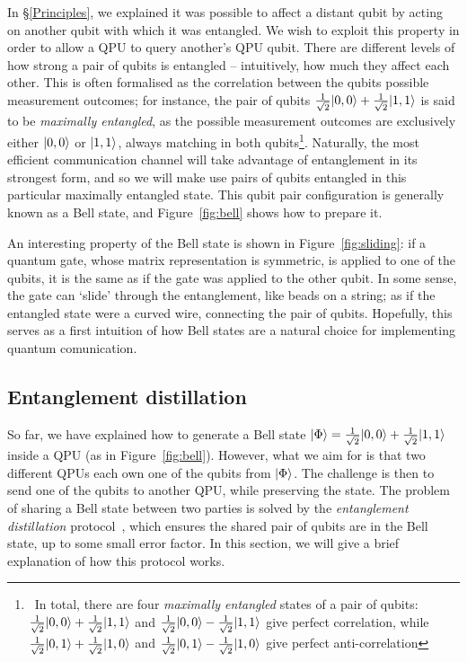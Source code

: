 In \S\ref{Principles}, we explained it was possible to affect a distant qubit by acting on another qubit with which it was entangled. We wish to exploit this property in order to allow a QPU to query another's QPU qubit. There are different levels of how strong a pair of qubits is entangled -- intuitively, how much they affect each other. This is often formalised as the correlation between the qubits possible measurement outcomes; for instance, the pair of qubits \(\frac{1}{\sqrt{2}}\vert 0,0 \rangle + \frac{1}{\sqrt{2}}\vert 1,1 \rangle\) is said to be \textit{maximally entangled}, as the possible measurement outcomes are exclusively either \(\vert 0,0 \rangle\) or \(\vert 1,1 \rangle\), always matching in both qubits\footnote{\, In total, there are four \textit{maximally entangled} states of a pair of qubits: \(\frac{1}{\sqrt{2}}\vert 0,0 \rangle + \frac{1}{\sqrt{2}}\vert 1,1 \rangle\) and \(\frac{1}{\sqrt{2}}\vert 0,0 \rangle - \frac{1}{\sqrt{2}}\vert 1,1 \rangle\) give perfect correlation, while \(\frac{1}{\sqrt{2}}\vert 0,1 \rangle + \frac{1}{\sqrt{2}}\vert 1,0 \rangle\) and \(\frac{1}{\sqrt{2}}\vert 0,1 \rangle - \frac{1}{\sqrt{2}}\vert 1,0 \rangle\) give perfect anti-correlation}. Naturally, the most efficient communication channel will take advantage of entanglement in its strongest form, and so we will make use pairs of qubits entangled in this particular maximally entangled state. This qubit pair configuration is generally known as a Bell state, and Figure~\ref{fig:bell} shows how to prepare it.



An interesting property of the Bell state is shown in Figure~\ref{fig:sliding}: if a quantum gate, whose matrix representation is symmetric, is applied to one of the qubits, it is the same as if the gate was applied to the other qubit. In some sense, the gate can `slide' through the entanglement, like beads on a string; as if the entangled state were a curved wire, connecting the pair of qubits. Hopefully, this serves as a first intuition of how Bell states are a natural choice for implementing quantum comunication.



\subsection{Entanglement distillation}
\label{Distillation}

So far, we have explained how to generate a Bell state \(\vert \Phi \rangle = \frac{1}{\sqrt{2}}\vert 0,0 \rangle + \frac{1}{\sqrt{2}}\vert 1,1 \rangle\) inside a QPU (as in Figure~\ref{fig:bell}). However, what we aim for is that two different QPUs each own one of the qubits from \(\vert \Phi \rangle\). The challenge is then to send one of the qubits to another QPU, while preserving the state. The problem of sharing a Bell state between two parties is solved by the \textit{entanglement distillation} protocol~\citep{DistillationProtocol}, which ensures the shared pair of qubits are in the Bell state, up to some small error factor. In this section, we will give a brief explanation of how this protocol works.

